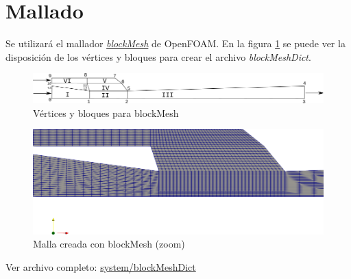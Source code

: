 \documentclass{article}
\begin{document}
\section{Mallado}
Se utilizará el mallador \textit{\href{https://cfd.direct/openfoam/user-guide/v6-blockmesh/}{blockMesh}} de OpenFOAM. En la figura \ref{fig:blockMesh} se puede ver la disposición de los vértices y bloques para crear el archivo \textit{blockMeshDict}.

\begin{landscape}
\newpage
	\begin{figure}[h!]
	\centering
	\includegraphics[width=1.5\textheight]{Figuras/01_blockMesh.png}
	\caption{Vértices y bloques para blockMesh}
	\label{fig:blockMesh}
	\end{figure}
\bigskip
	\begin{figure}[h!]
	\centering
	\includegraphics[width=1.5\textheight]{Figuras/01_mallado.png}
	\caption{Malla creada con blockMesh (zoom)}
	\label{fig:malla}
	\end{figure}
\end{landscape}
	
%
\noindent Ver archivo completo: \href{https://github.com/guillerolle/casos_cfd/blob/master/01/system/blockMeshDict}{system/blockMeshDict}
\end{document}
